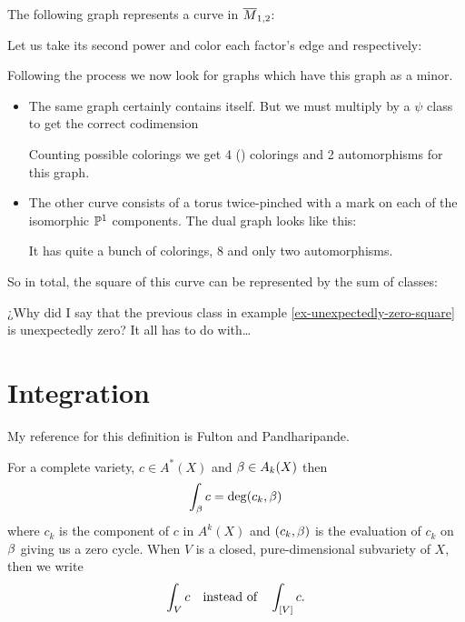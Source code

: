 \documentclass[12pt]{memoir}
\begin{document}
\begin{Ex}\label{ex-unexpectedly-zero-square}
    The following graph represents a curve in $\overline{M}_{1,2}$:\par
    Let us take its second power and color each factor's edge  and  respectively:\par
    Following the process we now look for graphs which have this graph as a minor.
    \begin{itemize}
        \item The same graph certainly contains itself. But we must multiply by a $\psi$ class to get the correct codimension\par
        Counting possible colorings we get 4 () colorings and 2 automorphisms for this graph.
        \item The other curve consists of a torus twice-pinched with a mark on each of the isomorphic $\mathbb{P}^1$ components. The dual graph looks like this:\par
        It has quite a bunch of colorings, 8 and only two automorphisms.
    \end{itemize}
    So in total, the square of this curve can be represented by the sum of classes:
\end{Ex}

¿Why did I say that the previous class in example \ref{ex-unexpectedly-zero-square} is unexpectedly zero? It all has to do with\dots


\section{Integration}

My reference for this definition is Fulton and Pandharipande\cite{FPNotes}.

\begin{Def}
    For a complete  variety, $c\in A^\ast(X)$ and $\beta\in A_k(X)$ then 
    $$\int_\beta c=\deg(c_k,\beta)$$
    where $c_k$ is the component of $c$ in $A^k(X)$ and $(c_k,\beta)$ is the evaluation of $c_k$ on $\beta$ giving us a zero cycle. When $V$ is a closed, pure-dimensional  subvariety of $X$, then we write 
    $$\int_V c\quad\text{instead of}\quad\int_{\left\lbrack V\right\rbrack}c.$$
\end{Def}
\end{document}
